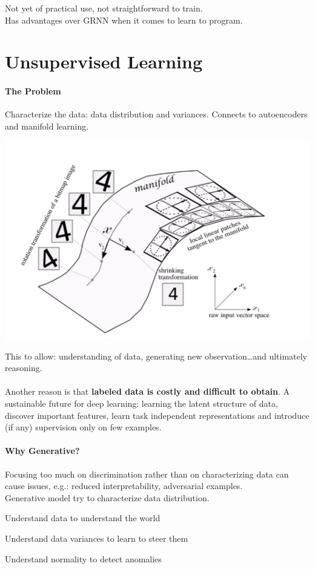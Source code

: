 \documentclass[10pt]{report}
\begin{document}
Not yet of practical use, not straightforward to train.\\
Has advantages over GRNN when it comes to learn to program.
\section{Unsupervised Learning}
\paragraph{The Problem} Characterize the data: data distribution and variances. Connects to autoencoders and manifold learning.\begin{center}
	\includegraphics[scale=0.5]{138.png}
\end{center}
This to allow: understanding of data, generating new observation\ldots and ultimately reasoning.\\\\
Another reason is that \textbf{labeled data is costly and difficult to obtain}. A sustainable future for deep learning: learning the latent structure of data, discover important features, learn task independent representations and introduce (if any) supervision only on few examples.
\paragraph{Why Generative?} Focusing too much on discrimination rather than on characterizing data can cause issues, e.g.: reduced interpretability, adversarial examples.\\
Generative model try to characterize data distribution. \begin{list}{}{}
	\item Understand data to understand the world
	\item Understand data variances to learn to steer them
	\item Understand normality to detect anomalies
\end{list}
\end{document}
